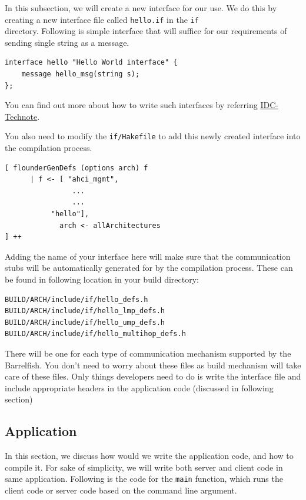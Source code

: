 In this subsection, we will create a new interface
for our use.  We do this by creating a new interface file called
\texttt{hello.if} in the \texttt{if\\} directory. Following is simple interface
that will suffice for our requirements of sending single string as a message.



\begin{verbatim}
interface hello "Hello World interface" {
    message hello_msg(string s);
};
\end{verbatim}

You can find out more about how to write such interfaces by referring
\href{http://www.barrelfish.org/TN-011-IDC.pdf}{IDC-Technote}.

You also need to modify the \texttt{if/Hakefile} to add this newly created
interface into the compilation process.

\begin{verbatim}
[ flounderGenDefs (options arch) f
      | f <- [ "ahci_mgmt",
                ...
                ...
 	       "hello"],
             arch <- allArchitectures
] ++
\end{verbatim}

Adding the name of your interface here will make sure that the communication
stubs will be automatically generated for by the compilation process.  These
can be found in following location in your build directory:

\begin{verbatim}
BUILD/ARCH/include/if/hello_defs.h
BUILD/ARCH/include/if/hello_lmp_defs.h
BUILD/ARCH/include/if/hello_ump_defs.h
BUILD/ARCH/include/if/hello_multihop_defs.h
\end{verbatim}

There will be one for each type of communication mechanism supported by
the Barrelfish. You don't need to worry about these files as build mechanism
will take care of these files.  Only things developers need to do is
write the interface file and include appropriate headers in the application
code (discussed in following section)


\subsection{Application}

In this section, we discuss how would we write the application code,
and how to compile it.  For sake of simplicity, we will write both server and
client code in same application.  Following is the code for the \texttt{main}
function, which runs the client code or server code based on the
command line argument.


